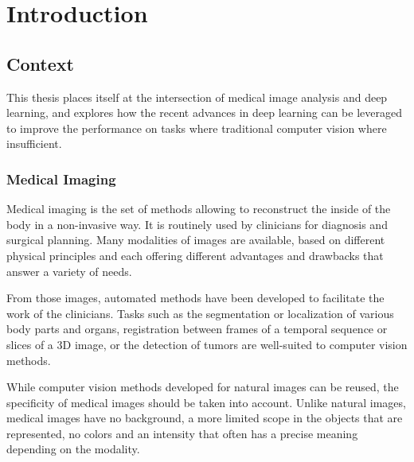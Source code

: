 \chapter{Introduction}
\label{chap:intro}





\section{Context}

This thesis places itself at the intersection of medical image analysis and deep learning, and explores how the recent advances in deep learning can be leveraged to improve the performance on tasks where traditional computer vision where insufficient. 

\subsection{Medical Imaging}

Medical imaging is the set of methods allowing to reconstruct the inside of the body in a non-invasive way. It is routinely used by clinicians for diagnosis and surgical planning. Many modalities of images are available, based on different physical principles and each offering different advantages and drawbacks that answer a variety of needs. 

From those images, automated methods have been developed to facilitate the work of the clinicians. Tasks such as the segmentation or localization of various body parts and organs, registration between frames of a temporal sequence or slices of a 3D image, or the detection of tumors are well-suited to computer vision methods.

While computer vision methods developed for natural images can be reused, the specificity of medical images should be taken into account. Unlike natural images, medical images have no background, a more limited scope in the objects that are represented, no colors and an intensity that often has a precise meaning depending on the modality.

